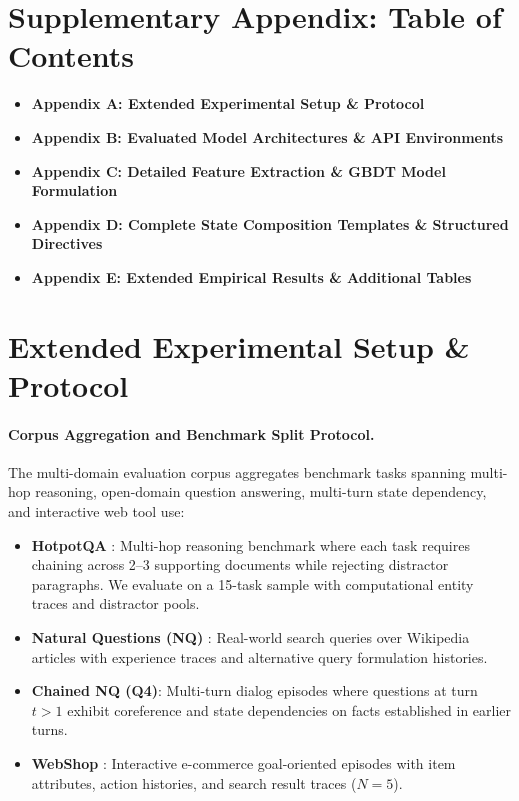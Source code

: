 \documentclass{article}
\begin{document}



\clearpage
\appendix

\section*{Supplementary Appendix: Table of Contents}

\begin{itemize}
    \item \textbf{Appendix A: Extended Experimental Setup \& Protocol}
    \item \textbf{Appendix B: Evaluated Model Architectures \& API Environments}
    \item \textbf{Appendix C: Detailed Feature Extraction \& GBDT Model Formulation}
    \item \textbf{Appendix D: Complete State Composition Templates \& Structured Directives}
    \item \textbf{Appendix E: Extended Empirical Results \& Additional Tables}
\end{itemize}

\section{Extended Experimental Setup \& Protocol}

\paragraph{Corpus Aggregation and Benchmark Split Protocol.} The multi-domain evaluation corpus aggregates benchmark tasks spanning multi-hop reasoning, open-domain question answering, multi-turn state dependency, and interactive web tool use:
\begin{itemize}
\item \textbf{HotpotQA} \citep{yang2018hotpotqa}: Multi-hop reasoning benchmark where each task requires chaining across 2--3 supporting documents while rejecting distractor paragraphs. We evaluate on a 15-task sample with computational entity traces and distractor pools.
\item \textbf{Natural Questions (NQ)} \citep{kwiatkowski2019naturalquestions}: Real-world search queries over Wikipedia articles with experience traces and alternative query formulation histories.
\item \textbf{Chained NQ (Q4)}: Multi-turn dialog episodes where questions at turn $t > 1$ exhibit coreference and state dependencies on facts established in earlier turns.
\item \textbf{WebShop} \citep{yao2022webshop}: Interactive e-commerce goal-oriented episodes with item attributes, action histories, and search result traces ($N=5$).
\end{itemize}
\end{document}
